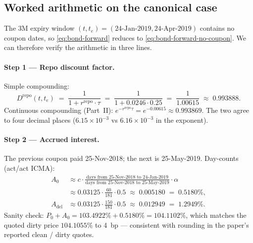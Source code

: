 \documentclass[11pt,a4paper]{article}
\newcommand{\Drepo}{D^{\mathrm{repo}}}
\newcommand{\Adel}{A_{\mathrm{del}}}
\newcommand{\rrepo}{r^{\mathrm{repo}}}
\begin{document}
\subsection{Worked arithmetic on the canonical case}\label{sec:arithmetic}

The 3M expiry window $(t, t_e) = (\text{24-Jan-2019}, \text{24-Apr-2019})$
contains no coupon dates, so \eqref{eq:bond-forward} reduces to
\eqref{eq:bond-forward-no-coupon}. We can therefore verify the
arithmetic in three lines.

\paragraph{Step 1 --- Repo discount factor.} Simple compounding:
\[
  \Drepo(t, t_e) \;=\; \frac{1}{1 + \rrepo \cdot \tau}
                  \;=\; \frac{1}{1 + 0.0246 \cdot 0.25}
                  \;=\; \frac{1}{1.00615}
                  \;\approx\; 0.993888.
\]
Continuous compounding (Part~II): $e^{-\rrepo \tau} = e^{-0.00615} \approx 0.993869$.
The two agree to four decimal places ($6.15\times 10^{-3}$ vs $6.16\times 10^{-3}$
in the exponent).

\paragraph{Step 2 --- Accrued interest.} The previous coupon paid
25-Nov-2018; the next is 25-May-2019. Day-counts (act/act ICMA):
\begin{align*}
  A_0    &\approx c \cdot \frac{\text{days from 25-Nov-2018 to 24-Jan-2019}}{\text{days from 25-Nov-2018 to 25-May-2019}} \cdot \alpha\\
         &\approx 0.03125 \cdot \frac{60}{181} \cdot 0.5 \;\approx\; 0.005180 \;=\; 0.5180\%, \\
  \Adel  &\approx 0.03125 \cdot \frac{150}{181} \cdot 0.5 \;\approx\; 0.012949 \;=\; 1.2949\%.
\end{align*}
Sanity check: $P_0 + A_0 = 103.4922\% + 0.5180\% = 104.1102\%$, which
matches the quoted dirty price $104.1055\%$ to 4~bp --- consistent
with rounding in the paper's reported clean / dirty quotes.
\end{document}
